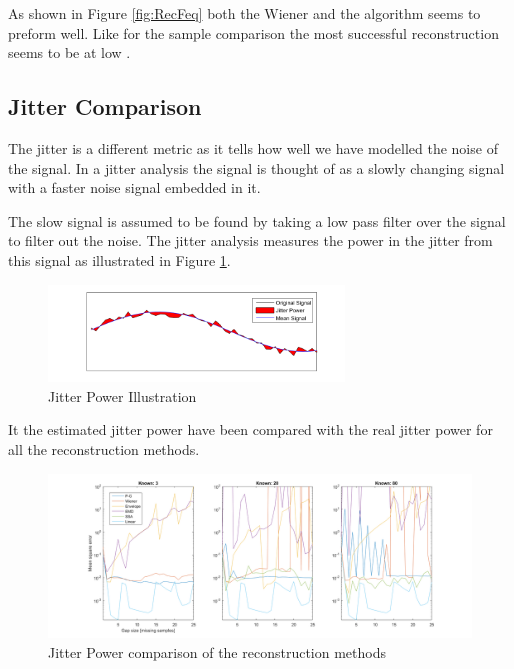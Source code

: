 As shown in Figure \ref{fig:RecFeq} both the Wiener and the  algorithm seems to preform well. Like for the sample comparison the most successful reconstruction seems to be at low . 

\subsection{Jitter Comparison }
\label{T:jitterCom}

The jitter is a different metric as it tells how well we have modelled the noise of the signal. In a jitter analysis the signal is thought of as a slowly changing signal with a faster noise signal embedded in it.

The slow signal is assumed to be found by taking a low pass filter over the signal to filter out the noise. The jitter analysis measures the power in the jitter from this signal as illustrated in Figure \ref{fig:JitPow}. 

\begin{figure}[H]
\centering
\includegraphics[width=0.7\textwidth]{billeder/JitterPower.png}
\caption{Jitter Power Illustration}
\label{fig:JitPow}
\end{figure}

It the estimated jitter power have been compared with the real jitter power for all the reconstruction methods. 

\begin{figure}[H]
\centering
\includegraphics[width=1\textwidth]{billeder/RecJitter.png}
\caption{Jitter Power comparison of the reconstruction methods}
\label{fig:RecJit}
\end{figure}


